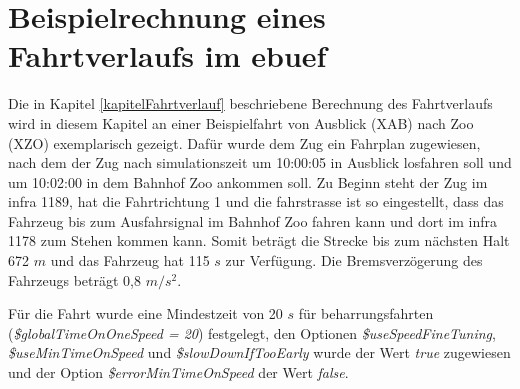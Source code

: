 \section{Beispielrechnung eines Fahrtverlaufs im \ac{ebuef}} \label{beispielrechnungKapitel}
Die in Kapitel \ref{kapitelFahrtverlauf} beschriebene Berechnung des Fahrtverlaufs wird in diesem Kapitel an einer Beispielfahrt von Ausblick (XAB) nach Zoo (XZO) exemplarisch gezeigt. Dafür wurde dem Zug ein Fahrplan zugewiesen, nach dem der Zug nach \Gls{simulationszeit} um 10:00:05 in Ausblick losfahren soll und um 10:02:00 in dem Bahnhof Zoo ankommen soll. Zu Beginn steht der Zug im \ac{infra}  1189, hat die Fahrtrichtung 1 und die \Gls{fahrstrasse} ist so eingestellt, dass das Fahrzeug bis zum Ausfahrsignal im Bahnhof Zoo fahren kann und dort im \ac{infra} 1178 zum Stehen kommen kann. Somit beträgt die Strecke bis zum nächsten Halt 672 $m$ und das Fahrzeug hat 115 $s$ zur Verfügung. Die Bremsverzögerung des Fahrzeugs beträgt 0,8 $m/s^{2}$.

Für die Fahrt wurde eine Mindestzeit von 20 $s$ für \Gls{beharrungsfahrt}en (\textit{\$glo\-bal\-Time\-On\-One\-Speed = 20}) festgelegt, den Optionen \textit{\$useSpeedFineTuning}, \textit{\$useMinTimeOnSpeed} und \textit{\$slowDownIfTooEarly} wurde der Wert \textit{true} zugewiesen und der Option \textit{\$errorMinTimeOnSpeed} der Wert \textit{false}.


